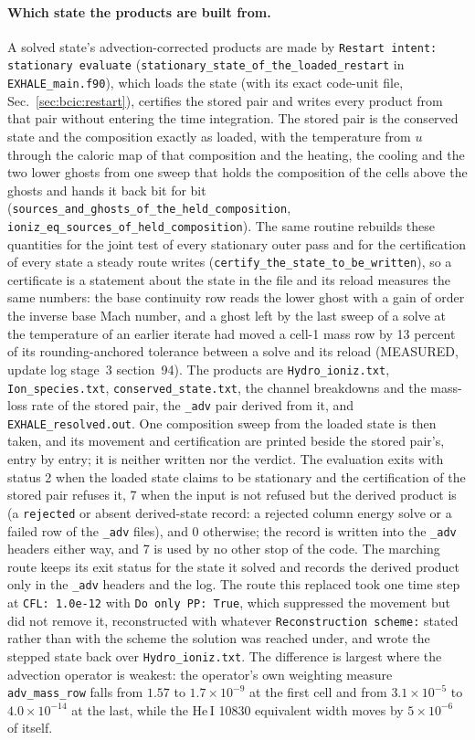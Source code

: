 \paragraph{Which state the products are built from.} A solved
state's advection-corrected products are made by \texttt{Restart intent:
stationary evaluate} (\texttt{stationary\_state\_of\_the\_loaded\_restart} in
\texttt{EXHALE\_main.f90}), which loads the state (with its exact code-unit
file, Sec.~\ref{sec:bcic:restart}), certifies the stored pair and writes
every product from that pair without entering the time integration.  The
stored pair is the conserved state and the composition exactly as loaded,
with the temperature from $u$ through the caloric map of that composition and
the heating, the cooling and the two lower ghosts from one sweep that holds
the composition of the cells above the ghosts and hands it back bit for bit
(\texttt{sources\_and\_ghosts\_of\_the\_held\_composition},
\texttt{ioniz\_eq\_sources\_of\_held\_composition}).  The same routine
rebuilds these quantities for the joint test of every stationary outer pass
and for the certification of every state a steady route writes
(\texttt{certify\_the\_state\_to\_be\_written}), so a certificate is a
statement about the state in the file and its reload measures the same
numbers: the base continuity row reads the lower ghost with a gain of order
the inverse base Mach number, and a ghost left by the last sweep of a solve
at the temperature of an earlier iterate had moved a cell-1 mass row by 13
percent of its rounding-anchored tolerance between a solve and its reload (MEASURED, update
log stage~3 section~94).  The products are \texttt{Hydro\_ioniz.txt},
\texttt{Ion\_species.txt}, \texttt{conserved\_state.txt}, the channel
breakdowns and the mass-loss rate of the stored pair, the \texttt{\_adv} pair
derived from it, and \texttt{EXHALE\_resolved.out}.  One composition sweep
from the loaded state is then taken, and its movement and certification are
printed beside the stored pair's, entry by entry; it is neither written nor
the verdict. The evaluation exits with status 2 when the loaded state claims
to be stationary and the certification of the stored pair refuses it, 7 when
the input is not refused but the derived product is (a \texttt{rejected} or
absent derived-state record: a rejected column energy solve or a failed row
of the \texttt{\_adv} files), and 0 otherwise; the record is written into the
\texttt{\_adv} headers either way, and 7 is used by no other stop of the
code. The marching route keeps its exit status for the state it solved and
records the derived product only in the \texttt{\_adv} headers and the log.
The route this replaced took one time
step at \texttt{CFL:\ 1.0e-12} with \texttt{Do only PP:\ True}, which
suppressed the movement but did not remove it, reconstructed with whatever
\texttt{Reconstruction scheme:} stated rather than with the scheme the
solution was reached under, and wrote the stepped state back over
\texttt{Hydro\_ioniz.txt}. The difference is largest where the advection
operator is weakest: the operator's own weighting measure
\texttt{adv\_mass\_row} falls from $1.57$ to $1.7\times10^{-9}$ at the first
cell and from $3.1\times10^{-5}$ to $4.0\times10^{-14}$ at the last, while the
He\,I 10830 equivalent width moves by $5\times10^{-6}$ of itself.


